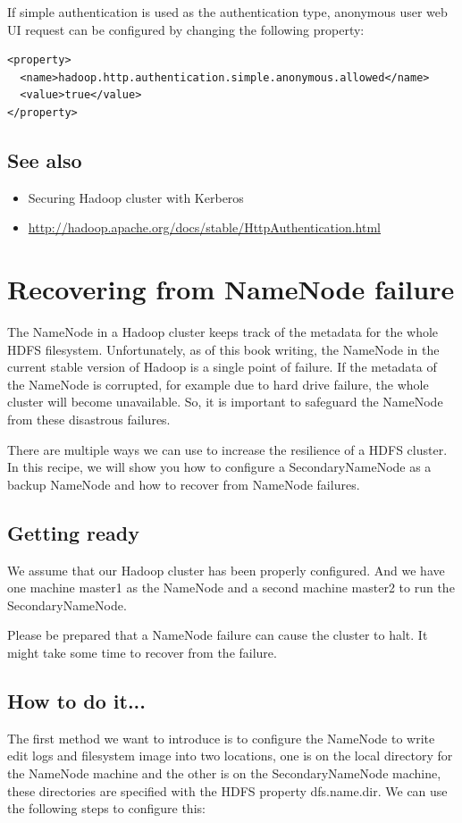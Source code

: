 If simple authentication is used as the authentication type, anonymous user web UI request can be configured by changing the following property:
\lstset{style=bashstyle}
\begin{lstlisting}
<property>
  <name>hadoop.http.authentication.simple.anonymous.allowed</name>
  <value>true</value>
</property>
\end{lstlisting}

\subsection*{See also}
\begin{itemize}
  \item Securing Hadoop cluster with Kerberos
  \item \url{http://hadoop.apache.org/docs/stable/HttpAuthentication.html}
\end{itemize}

\section{Recovering from NameNode failure}
The NameNode in a Hadoop cluster keeps track of the metadata for the whole HDFS filesystem. Unfortunately, as of this book writing, the NameNode in the current stable version of Hadoop is a single point of failure. If the metadata of the NameNode is corrupted, for example due to hard drive failure, the whole cluster will become unavailable. So, it is important to safeguard the NameNode from these disastrous failures.

There are multiple ways we can use to increase the resilience of a HDFS cluster. In this recipe, we will show you how to configure a SecondaryNameNode as a backup NameNode and how to recover from NameNode failures.
\subsection*{Getting ready}
We assume that our Hadoop cluster has been properly configured. And we have one machine master1 as the NameNode and a second machine master2 to run the SecondaryNameNode.

Please be prepared that a NameNode failure can cause the cluster to halt. It might take some time to recover from the failure.
\subsection*{How to do it...}
The first method we want to introduce is to configure the NameNode to write edit logs and filesystem image into two locations, one is on the local directory for the NameNode machine and the other is on the SecondaryNameNode machine, these directories are specified with the HDFS property dfs.name.dir. We can use the following steps to configure this:

